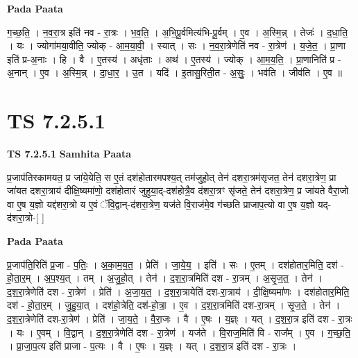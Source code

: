 \documentclass[17pt]{extarticle}
\begin{document}
\textbf{Pada Paata} \newline

ग॒च्छ॒ति॒ । न॒व॒रा॒त्र इति॑ नव - रा॒त्रः । भ॒व॒ति॒ । अ॒भि॒पू॒र्वमित्य॑भि-पू॒र्वम् । ए॒व । अ॒स्मि॒न्न् । तेजः॑ । द॒धा॒ति॒ । यः । ज्योगा॑मया॒वीति॒ ज्योक् - आ॒म॒या॒वी॒ । स्यात् । सः । न॒व॒रा॒त्रेणेति॑ नव - रा॒त्रेण॑ । य॒जे॒त॒ । प्रा॒णा इति॑ प्र-अ॒नाः । हि । वै । ए॒तस्य॑ । अधृ॑ताः । अथ॑ । ए॒तस्य॑ । ज्योक् । आ॒म॒य॒ति॒ । प्रा॒णानिति॑ प्र - अ॒नान् । ए॒व । अ॒स्मि॒न्न् । दा॒धा॒र॒ । उ॒त । यदि॑ । इ॒तासु॒रिती॒त - अ॒सुः॒ । भव॑ति । जीव॑ति । ए॒व ॥  \newline





\section{ TS 7.2.5.1 }

\textbf{TS 7.2.5.1 } \newline
\textbf{Samhita Paata} \newline

प्र॒जाप॑तिरकामयत॒ प्र जा॑ये॒येति॒ स ए॒तं दश॑होतारमपश्य॒त् तम॑जुहो॒त् तेन॑ दशरा॒त्रम॑सृजत॒ तेन॑ दशरा॒त्रेण॒ प्रा जा॑यत दशरा॒त्राय॑ दीक्षि॒ष्यमा॑णो॒ दश॑होतारं जुहुया॒द्-दश॑होत्रै॒व द॑शरा॒त्रꣳ सृ॑जते॒ तेन॑ दशरा॒त्रेण॒ प्र जा॑यते वैरा॒जो वा ए॒ष य॒ज्ञो यद्द॑शरा॒त्रो य ए॒वं ॅवि॒द्वान्-द॑शरा॒त्रेण॒ यज॑ते वि॒राज॑मे॒व ग॑च्छति प्राजाप॒त्यो वा ए॒ष य॒ज्ञो यद्-द॑शरा॒त्रो-[  ] \newline

\textbf{Pada Paata} \newline

प्र॒जाप॑ति॒रिति॑ प्र॒जा - प॒तिः॒ । अ॒का॒म॒य॒त॒ । प्रेति॑ । जा॒ये॒य॒ । इति॑ । सः । ए॒तम् । दश॑होतार॒मिति॒ दश॑ - हो॒ता॒र॒म् । अ॒प॒श्य॒त् । तम् । अ॒जु॒हो॒त् । तेन॑ । द॒श॒रा॒त्रमिति॑ दश - रा॒त्रम् । अ॒सृ॒ज॒त॒ । तेन॑ । द॒श॒रा॒त्रेणेति॑ दश - रा॒त्रेण॑ । प्रेति॑ । अ॒जा॒य॒त॒ । द॒श॒रा॒त्रायेति॑ दश-रा॒त्राय॑ । दी॒क्षि॒ष्यमा॑णः । दश॑होतार॒मिति॒ दश॑ - हो॒ता॒र॒म् । जु॒हु॒या॒त् । दश॑हो॒त्रेति॒ दश॑-हो॒त्रा॒ । ए॒व । द॒श॒रा॒त्रमिति॑ दश-रा॒त्रम् । सृ॒ज॒ते॒ । तेन॑ । द॒श॒रा॒त्रेणेति॑ दश-रा॒त्रेण॑ । प्रेति॑ । जा॒य॒ते॒ । वै॒रा॒जः । वै । ए॒षः । य॒ज्ञ्ः । यत् । द॒श॒रा॒त्र इति॑ दश - रा॒त्रः । यः । ए॒वम् । वि॒द्वान् । द॒श॒रा॒त्रेणेति॑ दश - रा॒त्रेण॑ । यज॑ते । वि॒राज॒मिति॑ वि - राज᳚म् । ए॒व । ग॒च्छ॒ति॒ । प्रा॒जा॒प॒त्य इति॑ प्राजा - प॒त्यः । वै । ए॒षः । य॒ज्ञ्ः । यत् । द॒श॒रा॒त्र इति॑ दश - रा॒त्रः ।  \newline
\end{document}

